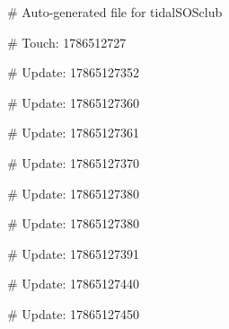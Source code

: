 # Auto-generated file for tidalSOSclub

# Touch: 1786512727

# Update: 17865127352

# Update: 17865127360

# Update: 17865127361

# Update: 17865127370

# Update: 17865127380

# Update: 17865127380

# Update: 17865127391

# Update: 17865127440

# Update: 17865127450
